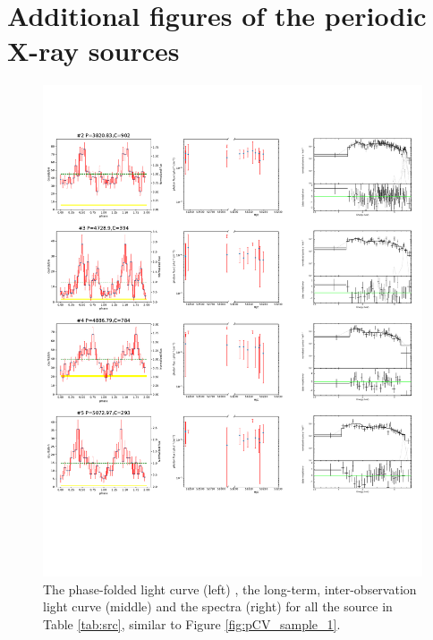 \documentclass[fleqn,usenatbib]{mnras}
\begin{document}
\section{Additional figures of the periodic X-ray sources}\label{appen:fig}
  \begin{figure}
    \centering
    \includegraphics[page=1,scale=0.90,trim=0 100 0 20,clip]{plot_figure_LW.pdf}
    \caption{The phase-folded light curve (left) , the long-term, inter-observation light curve (middle) and the spectra (right) for all the source in Table \ref{tab:src}, similar to Figure \ref{fig:pCV_sample_1}. 
    \label{fig:Figure_p}}
  \end{figure}
  
\end{document}
